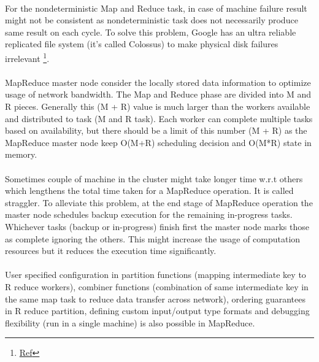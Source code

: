 \documentclass[8pt]{extarticle}
\begin{document}
\paragraph{}
For the nondeterministic Map and Reduce task, in case of machine failure result might not be consistent as nondeterministic task does not necessarily produce same result on each cycle. To solve this problem, Google has an ultra reliable replicated file system (it's called Colossus) to make physical disk failures irrelevant \footnote{\href{https://www.reddit.com/r/compsci/comments/1tdp9c/looking_for_clarification_on_googles_mapreduce/?st=j7dsu0tv&sh=079faa93}{Ref}}.

\paragraph{}
MapReduce master node consider the locally stored data information to optimize usage of network bandwidth. The Map and Reduce phase are divided into M and R pieces. Generally this (M + R)  value is much larger than the workers available and distributed to task (M and R task). Each worker can complete multiple  tasks based on  availability, but there should be a limit of this number (M + R) as the MapReduce master node keep O(M+R) scheduling decision and O(M*R) state in memory.

\paragraph{}
Sometimes couple of machine in the cluster might take longer time w.r.t others which lengthens the total time taken for a MapReduce operation. It is called straggler. To alleviate this problem, at the end stage of MapReduce operation the master node schedules backup execution for the remaining in-progress tasks. Whichever tasks (backup or in-progress) finish first the master node marks those as complete ignoring the others. This might increase the usage of computation resources but it reduces the execution time significantly.

\paragraph{}
User specified configuration in partition functions (mapping intermediate key to R reduce workers), combiner functions (combination of same intermediate key in the same map task to reduce data transfer across network), ordering guarantees in R reduce partition, defining custom input/output type formats and debugging flexibility (run in a single machine) is also possible in MapReduce.
\end{document}
